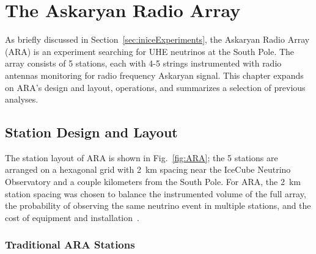 \chapter{The Askaryan Radio Array \label{chap:ARA}}

    As briefly discussed in Section~\ref{sec:iniceExperiments}, the Askaryan Radio Array (ARA) is an experiment searching for UHE neutrinos at the South Pole.
    The array consists of 5 stations, each with 4-5 strings instrumented with radio antennas monitoring for radio frequency Askaryan signal.
    This chapter expands on ARA's design and layout, operations, and summarizes a selection of previous analyses. 

\section{Station Design and Layout \label{sec:design_layout}}

    The station layout of ARA is shown in Fig.~\ref{fig:ARA}; the 5 stations are arranged on a hexagonal grid with 2~km spacing near the IceCube Neutrino Observatory and a couple kilometers from the South Pole. 
    For ARA, the 2~km station spacing was chosen to balance the instrumented volume of the full array, the probability of observing the same neutrino event in multiple stations, and the cost of equipment and installation~\citep{ara_design}.

    \subsection{Traditional ARA Stations \label{sec:ARA_design}}

